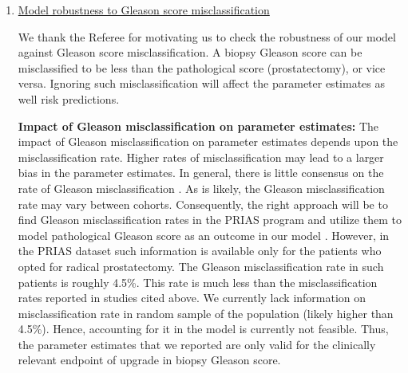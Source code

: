 \begin{enumerate}
			\item \underline{Model robustness to Gleason score misclassification}

			We thank the Referee for motivating us to check the robustness of our model against Gleason score misclassification. A biopsy Gleason score can be misclassified to be less than the pathological score (prostatectomy), or vice versa. Ignoring such misclassification will affect the parameter estimates as well risk predictions. 

			\textbf{Impact of Gleason misclassification on parameter estimates:}
			The impact of Gleason misclassification on parameter estimates depends upon the misclassification rate. Higher rates of misclassification may lead to a larger bias in the parameter estimates. In general, there is little consensus on the rate of Gleason misclassification \citep{cookson1997, Ploussard2010,Lattouf2002, Melia2006, Pinthus2006}. As is likely, the Gleason misclassification rate may vary between cohorts. Consequently, the right approach will be to find Gleason misclassification rates in the PRIAS program and utilize them to model pathological Gleason score as an outcome in our model \citep{balasubramanian2003estimation, coley2017}. However, in the PRIAS dataset such information is available only for the patients who opted for radical prostatectomy. The Gleason misclassification rate in such patients is roughly 4.5\%. This rate is much less than the misclassification rates reported in studies cited above. We currently lack information on misclassification rate in random sample of the population (likely higher than 4.5\%). Hence, accounting for it in the model is currently not feasible. Thus, the parameter estimates that we reported are only valid for the clinically relevant endpoint of upgrade in biopsy Gleason score. 



\end{enumerate}
